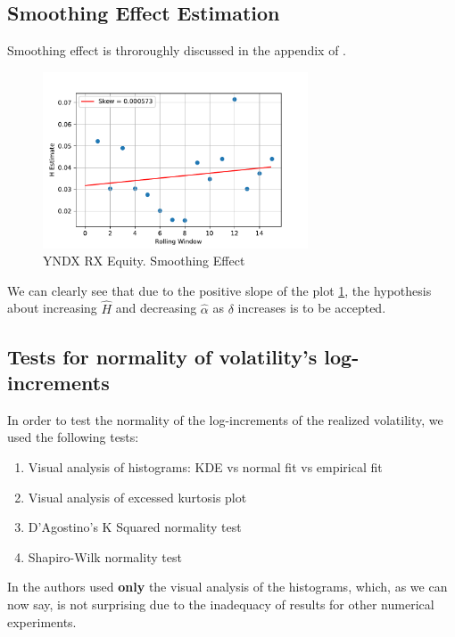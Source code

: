     \subsection{Smoothing Effect Estimation}
        Smoothing effect is throroughly discussed in the appendix of \cite{GatheralRosenbaum2014}.

        \begin{figure}[htbp]
            \includegraphics[width=0.7\textwidth]{fig/YNDX RX Equity Smoothing Effect.pdf}
            \caption{YNDX RX Equity. Smoothing Effect}
            \label{fig:smooth}
        \end{figure}

        We can clearly see that due to the positive slope of the plot \ref{fig:smooth}, the hypothesis about increasing $\hat{H}$ and decreasing $\hat{\alpha}$ as $\delta$ increases is to be accepted.

    \subsection{Tests for normality of volatility's log-increments}
        In order to test the normality of the log-increments of the realized volatility, we used the following tests:
        \begin{enumerate}
            \item Visual analysis of histograms: KDE vs normal fit vs empirical fit
            \item Visual analysis of excessed kurtosis plot
            \item D'Agostino's K Squared normality test
            \item Shapiro-Wilk normality test
        \end{enumerate}

        In \cite{GatheralRosenbaum2014} the authors used \textbf{only} the visual analysis of the 
        histograms, which, as we can now say, is not surprising due to the inadequacy of results 
        for other numerical experiments.

